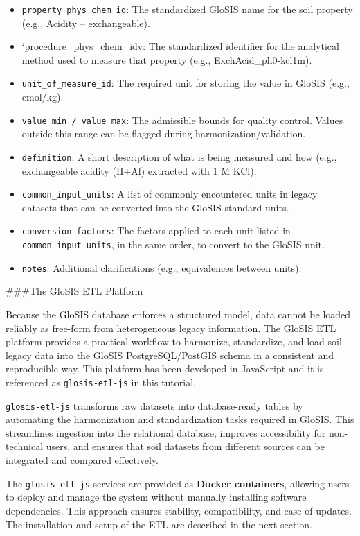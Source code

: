 \documentclass[
  10pt,
  b5paper,
  oneside]{book}
\begin{document}
\begin{itemize}
\item
  \texttt{property\_phys\_chem\_id}: The standardized GloSIS name for the soil property (e.g., Acidity -- exchangeable).
\item
  `procedure\_phys\_chem\_idv: The standardized identifier for the analytical method used to measure that property (e.g., ExchAcid\_ph0-kcl1m).
\item
  \texttt{unit\_of\_measure\_id}: The required unit for storing the value in GloSIS (e.g., cmol/kg).
\item
  \texttt{value\_min\ /\ value\_max}: The admissible bounds for quality control. Values outside this range can be flagged during harmonization/validation.
\item
  \texttt{definition}: A short description of what is being measured and how (e.g., exchangeable acidity (H+Al) extracted with 1 M KCl).
\item
  \texttt{common\_input\_units}: A list of commonly encountered units in legacy datasets that can be converted into the GloSIS standard units.
\item
  \texttt{conversion\_factors}: The factors applied to each unit listed in \texttt{common\_input\_units}, in the same order, to convert to the GloSIS unit.
\item
  \texttt{notes}: Additional clarifications (e.g., equivalences between units).
\end{itemize}

\#\#\#The GloSIS ETL Platform

Because the GloSIS database enforces a structured model, data cannot be loaded reliably as free-form from heterogeneous legacy information. The GloSIS ETL platform provides a practical workflow to harmonize, standardize, and load soil legacy data into the GloSIS PostgreSQL/PostGIS schema in a consistent and reproducible way. This platform has been developed in JavaScript and it is referenced as \texttt{glosis-etl-js} in this tutorial.

\texttt{glosis-etl-js} transforms raw datasets into database-ready tables by automating the harmonization and standardization tasks required in GloSIS. This streamlines ingestion into the relational database, improves accessibility for non-technical users, and ensures that soil datasets from different sources can be integrated and compared effectively.

The \texttt{glosis-etl-js} services are provided as \textbf{Docker containers}, allowing users to deploy and manage the system without manually installing software dependencies. This approach ensures stability, compatibility, and ease of updates. The installation and setup of the ETL are described in the next section.
\end{document}
